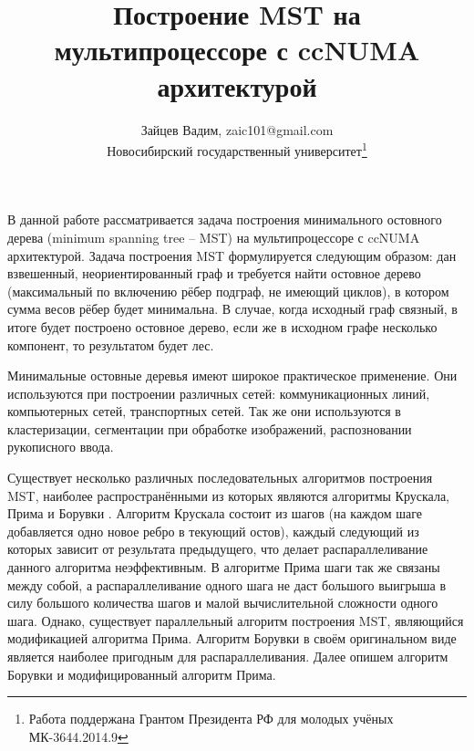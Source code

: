 \documentclass{article}
\date{}
\title{Построение MST на мультипроцессоре с ccNUMA архитектурой}
\author{Зайцев Вадим, zaic101@gmail.com \\ Новосибирский государственный университет\thanks{Работа поддержана Грантом Президента РФ для молодых учёных МК-3644.2014.9}}
\begin{document}
\maketitle




В данной работе рассматривается задача построения минимального остовного дерева (minimum spanning tree -- MST) на мультипроцессоре с ccNUMA архитектурой.
Задача построения MST формулируется следующим образом: дан взвешенный, неориентированный граф и требуется найти остовное дерево (максимальный по включению рёбер подграф, не имеющий циклов), в котором сумма весов рёбер будет минимальна.
В случае, когда исходный граф связный, в итоге будет построено остовное дерево, если же в исходном графе несколько компонент, то результатом будет лес.

Минимальные остовные деревья имеют широкое практическое применение.
Они используются при построении различных сетей: коммуникационных линий, компьютерных сетей, транспортных сетей.
Так же они используются в кластеризации, сегментации при обработке изображений, распозновании рукописного ввода.


Существует несколько различных последовательных алгоритмов построения MST, наиболее распространёнными из которых являются алгоритмы Крускала, Прима и Борувки \cite{cormen}.
Алгоритм Крускала состоит из шагов (на каждом шаге добавляется одно новое ребро в текующий остов), каждый следующий из которых зависит от результата предыдущего, что делает распараллеливание данного алгоритма неэффективным.
В алгоритме Прима шаги так же связаны между собой, а распараллеливание одного шага не даст большого выигрыша в силу большого количества шагов и малой вычислительной сложности одного шага.
Однако, существует параллельный алгоритм построения MST, являющийся модификацией алгоритма Прима.
Алгоритм Борувки в своём оригинальном виде является наиболее пригодным для распараллеливания. 
Далее опишем алгоритм Борувки и модифицированный алгоритм Прима.
\end{document}

